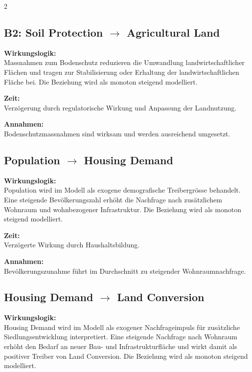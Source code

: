 \documentclass[10pt, a4paper]{article}
\begin{document}
\begin{multicols}{2}
\begin{minipage}{\linewidth}
\subsection*{B2: Soil Protection $\rightarrow$ Agricultural Land}

\textbf{Wirkungslogik:}\\
Massnahmen zum Bodenschutz reduzieren die Umwandlung landwirtschaftlicher Flächen und tragen zur Stabilisierung oder Erhaltung der landwirtschaftlichen Fläche bei.
Die Beziehung wird als monoton steigend modelliert.

\textbf{Zeit:}\\
Verzögerung durch regulatorische Wirkung und Anpassung der Landnutzung.

\textbf{Annahmen:}\\
Bodenschutzmassnahmen sind wirksam und werden ausreichend umgesetzt.
\end{minipage}\vspace{1em}

\begin{minipage}{\linewidth}
\subsection*{Population $\rightarrow$ Housing Demand}

\textbf{Wirkungslogik:}\\
Population wird im Modell als exogene demografische Treibergrösse behandelt.
Eine steigende Bevölkerungszahl erhöht die Nachfrage nach zusätzlichem Wohnraum und wohnbezogener Infrastruktur.
Die Beziehung wird als monoton steigend modelliert.

\textbf{Zeit:}\\
Verzögerte Wirkung durch Haushaltsbildung.

\textbf{Annahmen:}\\
Bevölkerungszunahme führt im Durchschnitt zu steigender Wohnraumnachfrage.
\end{minipage}\vspace{1em}

\begin{minipage}{\linewidth}
\subsection*{Housing Demand $\rightarrow$ Land Conversion}

\textbf{Wirkungslogik:}\\
Housing Demand wird im Modell als exogener Nachfrageimpuls für zusätzliche Siedlungsentwicklung interpretiert.
Eine steigende Nachfrage nach Wohnraum erhöht den Bedarf an neuer Bau- und Infrastrukturfläche und wirkt damit als positiver Treiber von Land Conversion.
Die Beziehung wird als monoton steigend modelliert.


\end{minipage}
\end{multicols}
\end{document}
